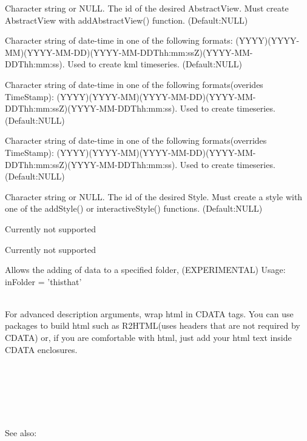 \documentclass[a4paper]{book}
\begin{document}
\begin{Arguments}
\begin{ldescription}
\item[\code{AbstractView}] Character string or NULL. The id of the desired AbstractView. Must create AbstractView with addAbstractView() function. (Default:NULL)
\item[\code{TimeStamp}]  Character string of date-time in one of the following formats: (YYYY)(YYYY-MM)(YYYY-MM-DD)(YYYY-MM-DDThh:mm:ssZ)(YYYY-MM-DDThh:mm:ss). Used to create kml timeseries. (Default:NULL)
\item[\code{TimeSpanStart}]  Character string of date-time in one of the following formats(overides TimeStamp): (YYYY)(YYYY-MM)(YYYY-MM-DD)(YYYY-MM-DDThh:mm:ssZ)(YYYY-MM-DDThh:mm:ss). Used to create timeseries. (Default:NULL)
\item[\code{TimeSpanEnd}]  Character string of date-time in one of the following formats(overrides TimeStamp): (YYYY)(YYYY-MM)(YYYY-MM-DD)(YYYY-MM-DDThh:mm:ssZ)(YYYY-MM-DDThh:mm:ss). Used to create timeseries. (Default:NULL) 
\item[\code{styleUrl}] Character string or NULL. The id of the desired Style. Must create a style with one of the addStyle() or interactiveStyle() functions. (Default:NULL)
\item[\code{Region}] Currently not supported
\item[\code{ExtendedData}] Currently not supported
\item[\code{inFolder}] Allows the adding of data to a specified folder, (EXPERIMENTAL) Usage: inFolder = 'this\bsl{}that'   

\end{ldescription}
\end{Arguments}
%
\begin{Note}\relax

\\{}
For advanced description arguments, wrap html in CDATA tags. You can use packages to build html such as R2HTML(uses headers that are not required by CDATA) or, if you are comfortable with html, just add your html text inside CDATA enclosures. \\{}
\code{text = ''<!\bsl{}[CDATA\bsl{}[ }\\{}
\\{}
\\{}
\\{}
\code{]]>''}\\{}
\\{}
See also: 

\end{Note}
\end{document}
